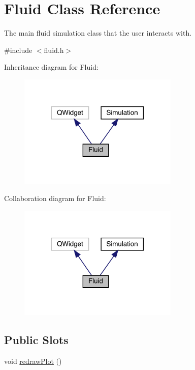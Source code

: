 \hypertarget{classFluid}{}\section{Fluid Class Reference}
\label{classFluid}


The main fluid simulation class that the user interacts with.  




{\ttfamily \#include $<$fluid.\+h$>$}



Inheritance diagram for Fluid\+:\nopagebreak
\begin{figure}[H]
\begin{center}
\leavevmode
\includegraphics[width=216pt]{classFluid__inherit__graph}
\end{center}
\end{figure}


Collaboration diagram for Fluid\+:\nopagebreak
\begin{figure}[H]
\begin{center}
\leavevmode
\includegraphics[width=216pt]{classFluid__coll__graph}
\end{center}
\end{figure}
\subsection*{Public Slots}
\begin{DoxyCompactItemize}
\item 
void \mbox{\hyperlink{classFluid_a020c8985824d3d7be033cb2916d77c24}{redraw\+Plot}} ()
\end{DoxyCompactItemize}
